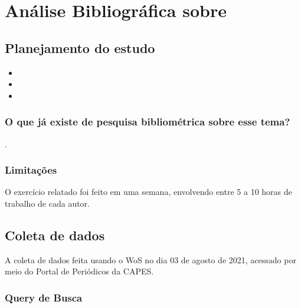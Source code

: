 \chapter{Análise Bibliográfica sobre\label{chap:bibliometria:}}

\section{Planejamento do estudo\label{}}

 
 

\begin{itemize}
    \item 
    \item 
    \item 
\end{itemize}

\subsection{O que já existe de pesquisa bibliométrica sobre esse tema?}

\cite{} 
\cite{}.


\subsection{Limitações} O exercício relatado foi feito em uma semana, envolvendo entre 5 a 10 horas de trabalho de cada autor.

\section{Coleta de dados\label{MASSA:coleta}}

A coleta de dados feita usando o WoS no dia 03 de agosto de 2021, acessado por meio do Portal de Periódicos da CAPES.


\subsection{Query de Busca}

